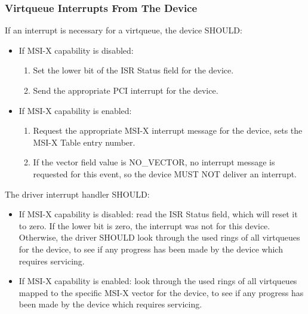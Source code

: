 \subsubsection{Virtqueue Interrupts From The Device}\label{sec:Virtio Transport Options / Virtio Over PCI Bus / PCI-specific Initialization And Device Operation / Virtqueue Interrupts From The Device}

If an interrupt is necessary for a virtqueue, the device SHOULD:

\begin{itemize}
  \item If MSI-X capability is disabled:
    \begin{enumerate}
    \item Set the lower bit of the ISR Status field for the device.

    \item Send the appropriate PCI interrupt for the device.
    \end{enumerate}

  \item If MSI-X capability is enabled:
    \begin{enumerate}
    \item Request the appropriate MSI-X interrupt message for the
      device,  sets the MSI-X Table entry
      number.

    \item If the vector field value is NO_VECTOR, no interrupt
      message is requested for this event, so the device MUST NOT
      deliver an interrupt.
    \end{enumerate}
\end{itemize}

The driver interrupt handler SHOULD:

\begin{itemize}
  \item If MSI-X capability is disabled: read the ISR Status field,
  which will reset it to zero. If the lower bit is zero, the
  interrupt was not for this device. Otherwise, the driver
  SHOULD look through the used rings of all virtqueues for the
  device, to see if any progress has been made by the device
  which requires servicing.

  \item If MSI-X capability is enabled: look through the used rings of
  all virtqueues mapped to the specific MSI-X vector for the
  device, to see if any progress has been made by the device
  which requires servicing.
\end{itemize}

